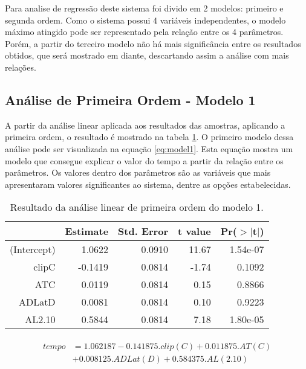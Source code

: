 Para analise de regressão deste sistema foi divido em 2 modelos: primeiro e segunda ordem. Como o sistema possui 4 variáveis independentes, o modelo máximo atingido pode ser representado pela relação entre os 4 parâmetros. Porém, a partir do terceiro modelo não há mais significância entre os resultados obtidos, que será mostrado em diante, descartando assim a análise com mais relações. 

\subsection{Análise de Primeira Ordem - Modelo 1}

A partir da análise linear aplicada aos resultados das amostras, aplicando a primeira ordem, o resultado é mostrado na tabela \ref{tab:model1}. O primeiro modelo dessa análise pode ser visualizada na equação \ref{eq:model1}. Esta equação mostra um modelo que consegue explicar o valor do tempo a partir da relação entre os parâmetros. Os valores dentro dos parâmetros são as variáveis que mais apresentaram valores significantes ao sistema, dentre as opções estabelecidas. 

\begin{table}[ht]
    \centering
    \caption{Resultado da análise linear de primeira ordem do modelo 1.}
    \begin{tabular}{rrrrr}
      \hline
     & Estimate & Std. Error & t value & Pr($>$$|$t$|$) \\ 
      \hline
    (Intercept) & 1.0622 & 0.0910 & 11.67 & 1.54e-07 \\ 
      clipC & -0.1419 & 0.0814 & -1.74 & 0.1092 \\ 
      ATC & 0.0119 & 0.0814 & 0.15 & 0.8866 \\ 
      ADLatD & 0.0081 & 0.0814 & 0.10 & 0.9223 \\ 
      AL2.10 & 0.5844 & 0.0814 & 7.18 & 1.80e-05 \\ 
       \hline
    \end{tabular}
    \label{tab:model1}
\end{table}

\begin{align}
    \begin{split}
    tempo & = 1.062187 - 0.141875. clip(C) + 0.011875 . AT(C) \\ 
    & + 0.008125.ADLat(D) + 0.584375 . AL(2.10)
    \end{split}
    \label{eq:model1}
\end{align}


